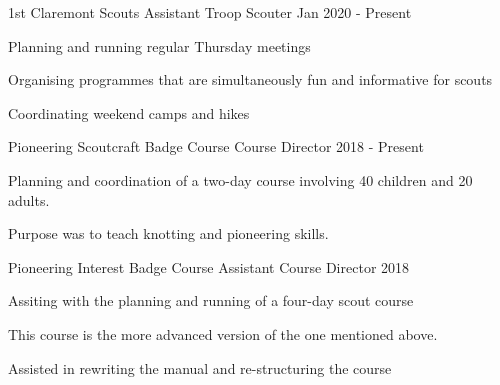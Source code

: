 
\begin{cventries}

      \cventry
        {1st Claremont Scouts} %
        {Assistant Troop Scouter} %
        {Jan 2020 - Present} %
        {} %
        {
          \begin{cvitems} %
            \item {Planning and running regular Thursday meetings}
            \item {Organising programmes that are simultaneously fun and informative for scouts}
            \item {Coordinating weekend camps and hikes}
          \end{cvitems}
        }
    

\cventry
{Pioneering Scoutcraft Badge Course} %
{Course Director} %
{2018 - Present} %
{} %
{
  \begin{cvitems} %
    \item {Planning and coordination of a two-day course involving 40 children and 20 adults.}
    \item {Purpose was to teach knotting and pioneering skills.}
  \end{cvitems}
}

\cventry
{Pioneering Interest Badge Course} %
{Assistant Course Director} %
{2018} %
{} %
{
  \begin{cvitems} %
    \item {Assiting with the planning and running of a four-day scout course}
    \item {This course is the more advanced version of the one mentioned above.}
    \item {Assisted in rewriting the manual and re-structuring the course}
  \end{cvitems}
}



\end{cventries}
